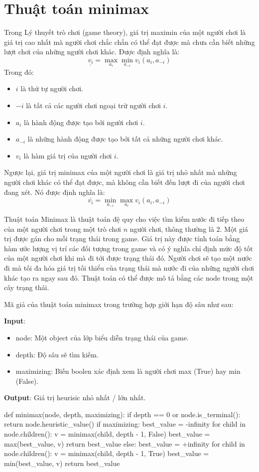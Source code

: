 \documentclass[12pt]{report}
\begin{document}
\section{Thuật toán minimax}
Trong Lý thuyết trò chơi (game theory), giá trị maximin của một người chơi là giá trị cao nhất mà người chơi chắc chắn có thể đạt được 
mà chưa cần biết những lượt chơi của những người chơi khác. Được định nghĩa là:
$$
\underline{v_i} = \max_{a_i} \min_{a_{-i}} v_i(a_i, a_{-i})
$$
Trong đó: 
\begin{itemize}
    \item $i$ là thứ tự người chơi. 
    \item $-i$ là tất cả các người chơi ngoại trừ người chơi $i$. 
    \item $a_i$ là hành động được tạo bởi người chơi $i$. 
    \item $a_{-i}$ là những hành động được tạo bởi tất cả những người chơi khác. 
    \item $v_i$ là hàm giá trị của người chơi $i$. 
\end{itemize}
Ngược lại, giá trị minimax của một người chơi là giá trị nhỏ nhất mà những người chơi khác có thể đạt được, mà không cần biết đến lượt 
đi của người chơi đang xét. Nó được định nghĩa là: 
$$
\overline{v_i} = \min_{a_{-i}} \max_{a_i} v_i(a_i, a_{-i})
$$

Thuật toán Minimax là thuật toán đệ quy cho việc tìm kiếm nước đi tiếp theo của một 
người chơi trong một trò chơi $n$ người chơi, thông thường là 2. 
Một giá trị được gán cho mỗi trạng thái trong game. Giá trị này được tính toán bằng hàm ước lượng vị trí các đối tượng trong game
và có ý nghĩa chỉ định mức độ tốt của một người chơi khi mà đi tới được trạng thái đó. 
Người chơi sẽ tạo một nước đi mà tối đa hóa giá trị tối thiểu của trạng thái mà nước đi của những người chơi khác tạo ra ngay sau đó. 
Thuật toán có thể được mô tả bằng các node trong một cây trạng thái. 

Mã giả của thuật toán minimax trong trường hợp giới hạn độ sâu như sau: 
\newpage

\noindent
\textbf{Input}:
\begin{itemize}
    \item node: Một object của lớp biểu diễn trạng thái của game. 
    \item depth: Độ sâu sẽ tìm kiếm. 
    \item maximizing: Biến boolen xác định xem là người chơi max (True) hay min (False). 
\end{itemize}
\textbf{Output}: Giá trị heurisic nhỏ nhất / lớn nhất. \\[0.5cm]
\begin{python}
def minimax(node, depth, maximizing):
    if depth == 0 or node.is_terminal():
        return node.heuristic_value()
    if maximizing:
        best_value = -infinity
        for child in node.children():
            v = minimax(child, depth - 1, False)
            best_value = max(best_value, v)
        return best_value
    else:
        best_value = +infinity
        for child in node.children():
            v = minimax(child, depth - 1, True)
            best_value = min(best_value, v)
        return best_value
\end{python} 
\end{document}
